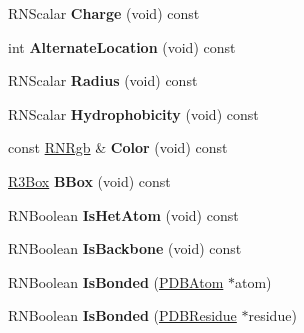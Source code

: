 \begin{DoxyCompactItemize}
\item 
R\+N\+Scalar {\bfseries Charge} (void) const \hypertarget{class_p_d_b_atom_a6d76c30e61a854713f03e4d55412f389}{}\label{class_p_d_b_atom_a6d76c30e61a854713f03e4d55412f389}

\item 
int {\bfseries Alternate\+Location} (void) const \hypertarget{class_p_d_b_atom_ab6c99d01a4bfa0035befaeeb62045670}{}\label{class_p_d_b_atom_ab6c99d01a4bfa0035befaeeb62045670}

\item 
R\+N\+Scalar {\bfseries Radius} (void) const \hypertarget{class_p_d_b_atom_aa2b76e8743295f5de202492f94c5a5f9}{}\label{class_p_d_b_atom_aa2b76e8743295f5de202492f94c5a5f9}

\item 
R\+N\+Scalar {\bfseries Hydrophobicity} (void) const \hypertarget{class_p_d_b_atom_abf0858af3ac14e2b7ed582008c324099}{}\label{class_p_d_b_atom_abf0858af3ac14e2b7ed582008c324099}

\item 
const \hyperlink{class_r_n_rgb}{R\+N\+Rgb} \& {\bfseries Color} (void) const \hypertarget{class_p_d_b_atom_a0fab46caaf8eabb69bfe88b147497dbd}{}\label{class_p_d_b_atom_a0fab46caaf8eabb69bfe88b147497dbd}

\item 
\hyperlink{class_r3_box}{R3\+Box} {\bfseries B\+Box} (void) const \hypertarget{class_p_d_b_atom_a9080dfdb128ca629120423d276bac48f}{}\label{class_p_d_b_atom_a9080dfdb128ca629120423d276bac48f}

\item 
R\+N\+Boolean {\bfseries Is\+Het\+Atom} (void) const \hypertarget{class_p_d_b_atom_ad4f3347874b94b878eb1cf992692ebe9}{}\label{class_p_d_b_atom_ad4f3347874b94b878eb1cf992692ebe9}

\item 
R\+N\+Boolean {\bfseries Is\+Backbone} (void) const \hypertarget{class_p_d_b_atom_a6c2f67a10b3dc919922d7a00ed75f170}{}\label{class_p_d_b_atom_a6c2f67a10b3dc919922d7a00ed75f170}

\item 
R\+N\+Boolean {\bfseries Is\+Bonded} (\hyperlink{class_p_d_b_atom}{P\+D\+B\+Atom} $\ast$atom)\hypertarget{class_p_d_b_atom_aaa04f60979539ea6299f50972bcdd88b}{}\label{class_p_d_b_atom_aaa04f60979539ea6299f50972bcdd88b}

\item 
R\+N\+Boolean {\bfseries Is\+Bonded} (\hyperlink{class_p_d_b_residue}{P\+D\+B\+Residue} $\ast$residue)\hypertarget{class_p_d_b_atom_acbe09e4e5417f903c2d0747e7d1d2544}{}\label{class_p_d_b_atom_acbe09e4e5417f903c2d0747e7d1d2544}


\end{DoxyCompactItemize}
